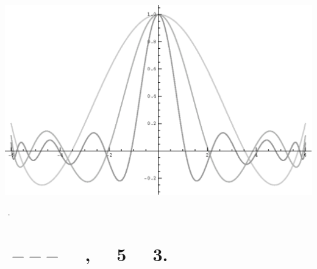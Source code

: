 \documentclass{article}
\newcommand{\unicode}[1]{{}}
\begin{document}
\includegraphics{report_gr5.eps}

$\unicode{0421}\unicode{043d}\unicode{043e}\unicode{0432}\unicode{0430}$ $\unicode{043b}\unicode{0443}\unicode{0447}\unicode{0448}\unicode{0435}$.

\section*{$\unicode{0412}\unicode{044b}\unicode{0432}\unicode{043e}\unicode{0434}$ $---$ $\unicode{0438}\unicode{043d}\unicode{0442}\unicode{0435}\unicode{0440}\unicode{043f}\unicode{043e}\unicode{043b}\unicode{044f}\unicode{0446}\unicode{0438}\unicode{044f}$
$\unicode{043f}\unicode{043e}$ $\unicode{0427}\unicode{0435}\unicode{0431}\unicode{044b}\unicode{0448}\unicode{0435}\unicode{0432}\unicode{0443}$
$\unicode{0442}\unicode{043e}\unicode{0447}\unicode{043d}\unicode{0435}\unicode{0435}$, $\unicode{0445}\unicode{043e}\unicode{0442}\unicode{044c}$
$\unicode{0438}$ $\unicode{0442}\unicode{0440}\unicode{0435}\unicode{0431}\unicode{0443}\unicode{0435}\unicode{0442}$ 5 $\unicode{0432}\unicode{043b}\unicode{043e}\unicode{0436}\unicode{0435}\unicode{043d}\unicode{043d}\unicode{044b}\unicode{0445}$
$\unicode{0446}\unicode{0438}\unicode{043a}\unicode{043b}\unicode{043e}\unicode{0432}$ $\unicode{0432}\unicode{043c}\unicode{0435}\unicode{0441}\unicode{0442}\unicode{043e}$
3.}
\end{document}
